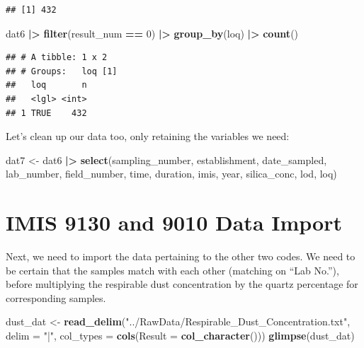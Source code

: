 \documentclass[
]{article}
\newenvironment{Shaded}{\begin{snugshade}}{\end{snugshade}}
\newcommand{\AttributeTok}[1]{\textcolor[rgb]{0.13,0.29,0.53}{#1}}
\newcommand{\DecValTok}[1]{\textcolor[rgb]{0.00,0.00,0.81}{#1}}
\newcommand{\FunctionTok}[1]{\textcolor[rgb]{0.13,0.29,0.53}{\textbf{#1}}}
\newcommand{\NormalTok}[1]{#1}
\newcommand{\OtherTok}[1]{\textcolor[rgb]{0.56,0.35,0.01}{#1}}
\newcommand{\SpecialCharTok}[1]{\textcolor[rgb]{0.81,0.36,0.00}{\textbf{#1}}}
\newcommand{\StringTok}[1]{\textcolor[rgb]{0.31,0.60,0.02}{#1}}
\begin{document}
\begin{verbatim}
## [1] 432
\end{verbatim}

\begin{Shaded}
\begin{Highlighting}[]
\NormalTok{dat6 }\SpecialCharTok{|\textgreater{}} 
  \FunctionTok{filter}\NormalTok{(result\_num }\SpecialCharTok{==} \DecValTok{0}\NormalTok{) }\SpecialCharTok{|\textgreater{}} 
  \FunctionTok{group\_by}\NormalTok{(loq) }\SpecialCharTok{|\textgreater{}} 
  \FunctionTok{count}\NormalTok{()}
\end{Highlighting}
\end{Shaded}

\begin{verbatim}
## # A tibble: 1 x 2
## # Groups:   loq [1]
##   loq       n
##   <lgl> <int>
## 1 TRUE    432
\end{verbatim}

Let's clean up our data too, only retaining the variables we need:

\begin{Shaded}
\begin{Highlighting}[]
\NormalTok{dat7 }\OtherTok{\textless{}{-}}\NormalTok{ dat6 }\SpecialCharTok{|\textgreater{}} 
  \FunctionTok{select}\NormalTok{(sampling\_number, establishment, date\_sampled, lab\_number, field\_number, time, duration, imis, year, silica\_conc, lod, loq)}
\end{Highlighting}
\end{Shaded}

\section{IMIS 9130 and 9010 Data
Import}\label{imis-9130-and-9010-data-import}

Next, we need to import the data pertaining to the other two codes. We
need to be certain that the samples match with each other (matching on
``Lab No.''), before multiplying the respirable dust concentration by
the quartz percentage for corresponding samples.

\begin{Shaded}
\begin{Highlighting}[]
\NormalTok{dust\_dat }\OtherTok{\textless{}{-}} \FunctionTok{read\_delim}\NormalTok{(}\StringTok{"../RawData/Respirable\_Dust\_Concentration.txt"}\NormalTok{, }\AttributeTok{delim =} \StringTok{"|"}\NormalTok{,}
           \AttributeTok{col\_types =} \FunctionTok{cols}\NormalTok{(}\AttributeTok{Result =} \FunctionTok{col\_character}\NormalTok{()))}
\FunctionTok{glimpse}\NormalTok{(dust\_dat)}
\end{Highlighting}
\end{Shaded}
\end{document}
